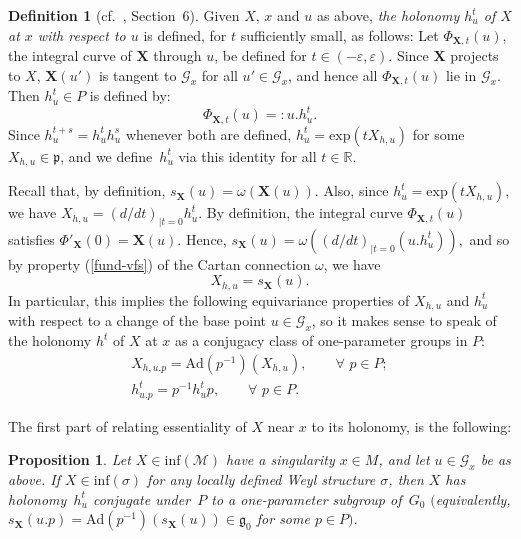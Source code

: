 \documentclass[11pt]{article}
\def\R{\mathbb{R}}
\def\g{\mathfrak{g}}
\def\p{\mathfrak{p}}
\def\Gbdle{\mathcal{G}}
\theoremstyle{plain}
\newtheorem{Proposition}[Theorem]{Proposition}
\theoremstyle{definition}
\newtheorem{Definition}{Definition}[section]
\begin{document}
\begin{Definition}[cf.~\cite{Frances3}, Section~6] \label{holonomy definition} Given $X$, $x$ and $u$ as above, \emph{the holonomy $h_u^t$ of $X$ at $x$ with respect to $u$} is def\/ined, for $t$ suf\/f\/iciently small, as follows: Let $\Phi_{\mathbf{X},t}(u)$, the integral curve of $\mathbf{X}$ through $u$, be def\/ined for $t \in (-\varepsilon,\varepsilon)$. Since $\mathbf{X}$ projects to $X$, $\mathbf{X}(u')$ is tangent to $\Gbdle_x$ for all $u' \in \Gbdle_x$, and hence all $\Phi_{\mathbf{X},t}(u)$ lie in $\Gbdle_x$. Then $h_u^t \in P$ is def\/ined by:
\[
\Phi_{\mathbf{X},t}(u) =: u.h^t_u.
\]
Since $h_u^{t+s} = h_u^th_u^s$ whenever both are def\/ined, $h_u^t = \mathrm{exp}(tX_{h,u})$ for some $X_{h,u} \in \p$, and we def\/ine~$h_u^t$ via this identity for all $t \in \R$.
\end{Definition}

Recall that, by def\/inition, $s_{\mathbf{X}}(u) = \omega(\mathbf{X}(u))$. Also, since $h_u^t = \mathrm{exp}(tX_{h,u})$, we have $X_{h,u} = (d/dt)_{\vert t=0} h_u^t$. By def\/inition, the integral curve $\Phi_{\mathbf{X},t}(u)$ satisf\/ies $\Phi'_{\mathbf{X}}(0) = \mathbf{X}(u)$. Hence, $s_{\mathbf{X}}(u) = \omega((d/dt)_{\vert t=0}(u.h_u^t)),$ and so by property (\ref{fund-vfs}) of the Cartan connection $\omega$, we have
\[
X_{h,u} = s_{\mathbf{X}}(u).
\]
In particular, this implies the following equivariance properties of $X_{h,u}$ and $h_u^t$ with respect to a change of the base point $u \in \Gbdle_x$, so it makes sense to speak of the holonomy $h^t$ of $X$ at $x$ as a conjugacy class of one-parameter groups in $P$:
\begin{gather*}
X_{h,u.p} = \mathrm{Ad}(p^{-1})(X_{h,u}), \qquad \forall \,\, p \in P;\\
h_{u.p}^t = p^{-1}h_u^tp, \qquad \forall \,\, p \in P.
\end{gather*}

The f\/irst part of relating essentiality of $X$ near $x$ to its holonomy, is the following:

\begin{Proposition} \label{necessary holonomy} Let $X \in \mathrm{inf}(\mathcal{M})$ have a singularity $x \in M$, and let $u \in \Gbdle_x$ be as above. If $X \in \mathrm{inf}(\sigma)$ for any locally defined Weyl structure $\sigma$, then $X$ has holonomy~$h_u^t$ conjugate under~$P$ to a one-parameter subgroup of~$G_0$ $($equivalently, $s_{\mathbf{X}}(u.p) = \mathrm{Ad}(p^{-1})(s_{\mathbf{X}}(u)) \in \g_0$ for some $p \in P)$.
\end{Proposition}
\end{document}

